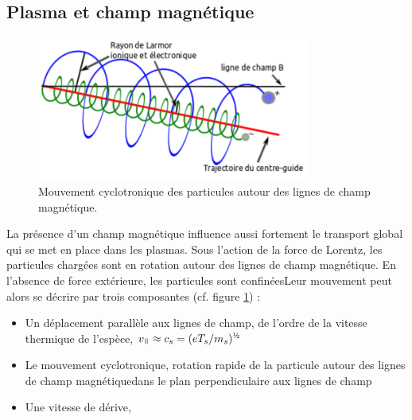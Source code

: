 \subsection{Plasma et champ magnétique}
%
\begin{figure}
\centering
\includegraphics[width=0.8\textwidth]{figures/mouvementCyclotron.png}
{\caption{Mouvement cyclotronique des particules autour des lignes de champ
magnétique.}\label{1-particleDrifts}}
\end{figure}
La présence d'un champ magnétique influence aussi fortement le transport global qui
se met en place dans les plasmas. Sous l'action de la force de Lorentz, les particules
chargées sont en rotation autour des lignes de champ magnétique. En l'absence de force
extérieure, les particules sont confinéesLeur mouvement peut alors
se décrire par trois composantes (cf. figure \ref{1-particleDrifts}) :
\begin{itemize}
  \item Un déplacement parallèle aux lignes de champ, de l'ordre de la vitesse
  thermique de l'espèce, $v_\para\approx c_s=(eT_s/m_s)^{\text{\textonehalf}}$
  \item Le mouvement cyclotronique, rotation rapide de la particule
  autour des lignes de champ magnétiquedans le plan perpendiculaire aux lignes
  de champ
  \item Une vitesse de dérive,
\end{itemize}


